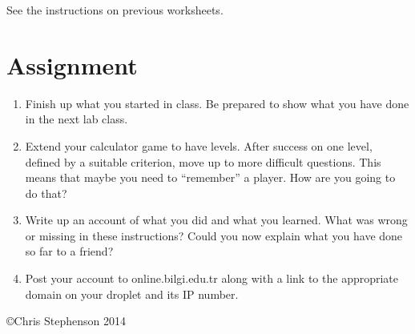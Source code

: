 \documentclass[12pt, a4paper]{article}
\begin{document}
See the instructions on previous worksheets.


\section*{Assignment}

\begin{enumerate}
\item Finish up what you started in class. Be prepared to show what you have done in the next lab class. 
\item Extend your calculator game to have levels. After success on one level, defined by a suitable criterion, move up to more difficult questions. This means that maybe you need to ``remember'' a player. How are you going to do that?
\item Write up an account of what you did and what you learned. What was wrong or missing in these instructions? Could you now explain what you have done so far to a friend?
\item Post your account to online.bilgi.edu.tr along with a link to the appropriate domain on your droplet and its IP number.

\end{enumerate}

\copyright Chris Stephenson 2014
\end{document}
